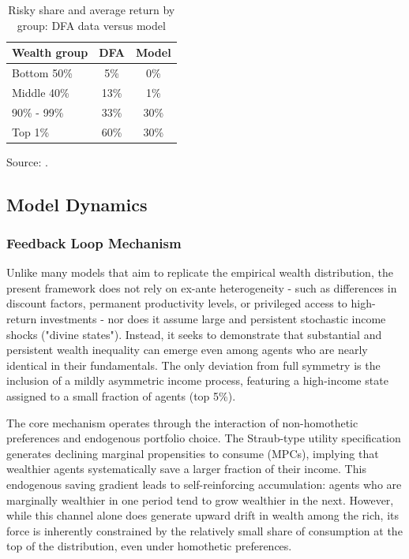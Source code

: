 \documentclass[12pt]{article}
\begin{document}
\begin{table}[htbp]
\centering
\caption{Risky share and average return by group: DFA data versus model}
\label{tab:return}
\begin{tabular}{@{} lcc @{}}
\toprule
\textbf{Wealth group} & \textbf{DFA} & \textbf{Model}  \\
\midrule
Bottom 50\%      & 5\%   & 0\% \\
Middle 40\%      & 13\%  & 1\% \\ 
90\% - 99\%      & 33\%  & 30\% \\
Top 1\%          & 60\%  & 30\% \\
\bottomrule
\end{tabular}

\vspace{0.5em}
\begin{minipage}{0.9\linewidth}
\small Source: \textcite{dfa2024}.
\end{minipage}
\end{table}

\subsection{Model Dynamics}

\subsubsection{Feedback Loop Mechanism}

Unlike many models that aim to replicate the empirical wealth distribution, the present framework does not rely on ex-ante heterogeneity - such as differences in discount factors, permanent productivity levels, or privileged access to high-return investments - nor does it assume large and persistent stochastic income shocks ("divine states"). Instead, it seeks to demonstrate that substantial and persistent wealth inequality can emerge even among agents who are nearly identical in their fundamentals. The only deviation from full symmetry is the inclusion of a mildly asymmetric income process, featuring a high-income state assigned to a small fraction of agents (top 5\%).

The core mechanism operates through the interaction of non-homothetic preferences and endogenous portfolio choice. The Straub-type utility specification generates declining marginal propensities to consume (MPCs), implying that wealthier agents systematically save a larger fraction of their income. This endogenous saving gradient leads to self-reinforcing accumulation: agents who are marginally wealthier in one period tend to grow wealthier in the next. However, while this channel alone does generate upward drift in wealth among the rich, its force is inherently constrained by the relatively small share of consumption at the top of the distribution, even under homothetic preferences.
\end{document}
